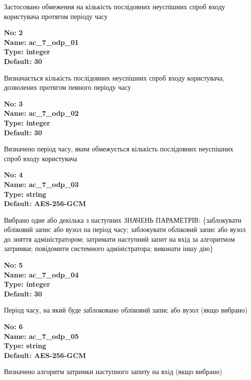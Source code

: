 \documentclass{article}
\begin{document}
{\footnotesize Застосовано обмеження на кількість послідовних неуспішних спроб входу користувача протягом періоду часу}


{\footnotesize\bfseries
No: 2\\
Name: ac\_\allowbreak{}7\_\allowbreak{}odp\_\allowbreak{}01\\
Type: integer\\
Default: 30
}

{\footnotesize Визначається кількість послідовних неуспішних спроб входу користувача, дозволених протягом певного періоду часу}


{\footnotesize\bfseries
No: 3\\
Name: ac\_\allowbreak{}7\_\allowbreak{}odp\_\allowbreak{}02\\
Type: integer\\
Default: 30
}

{\footnotesize Визначено період часу, яким обмежується кількість послідовних неуспішних спроб входу користувача}


{\footnotesize\bfseries
No: 4\\
Name: ac\_\allowbreak{}7\_\allowbreak{}odp\_\allowbreak{}03\\
Type: string\\
Default: \textquotedbl{}AES-256-GCM\textquotedbl{}
}

{\footnotesize Вибрано одне або декілька з наступних ЗНАЧЕНЬ ПАРАМЕТРІВ: \{заблокувати обліковий запис або вузол на період часу; заблокувати обліковий запис або вузол до зняття адміністратором; затримати наступний запит на вхід за алгоритмом затримки; повідомити системного адміністратора; виконати іншу дію\}}


{\footnotesize\bfseries
No: 5\\
Name: ac\_\allowbreak{}7\_\allowbreak{}odp\_\allowbreak{}04\\
Type: integer\\
Default: 30
}

{\footnotesize Період часу, на який буде заблоковано обліковий запис або вузол (якщо вибрано)}


{\footnotesize\bfseries
No: 6\\
Name: ac\_\allowbreak{}7\_\allowbreak{}odp\_\allowbreak{}05\\
Type: string\\
Default: \textquotedbl{}AES-256-GCM\textquotedbl{}
}

{\footnotesize Визначено алгоритм затримки наступного запиту на вхід (якщо вибрано)}
\end{document}
